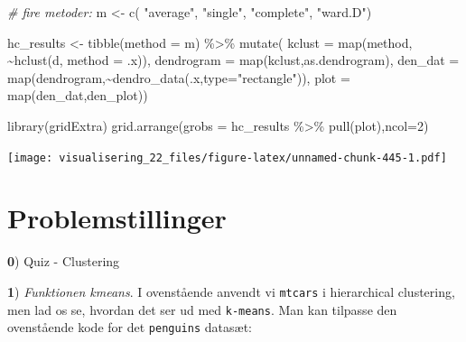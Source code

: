 \documentclass[
]{book}
\newenvironment{Shaded}{\begin{snugshade}}{\end{snugshade}}
\newcommand{\AttributeTok}[1]{\textcolor[rgb]{0.77,0.63,0.00}{#1}}
\newcommand{\CommentTok}[1]{\textcolor[rgb]{0.56,0.35,0.01}{\textit{#1}}}
\newcommand{\DecValTok}[1]{\textcolor[rgb]{0.00,0.00,0.81}{#1}}
\newcommand{\FunctionTok}[1]{\textcolor[rgb]{0.00,0.00,0.00}{#1}}
\newcommand{\NormalTok}[1]{#1}
\newcommand{\OtherTok}[1]{\textcolor[rgb]{0.56,0.35,0.01}{#1}}
\newcommand{\SpecialCharTok}[1]{\textcolor[rgb]{0.00,0.00,0.00}{#1}}
\newcommand{\StringTok}[1]{\textcolor[rgb]{0.31,0.60,0.02}{#1}}
\begin{document}
\begin{Shaded}
\begin{Highlighting}[]
\CommentTok{\# fire metoder:}
\NormalTok{m }\OtherTok{\textless{}{-}} \FunctionTok{c}\NormalTok{( }\StringTok{"average"}\NormalTok{, }\StringTok{"single"}\NormalTok{, }\StringTok{"complete"}\NormalTok{, }\StringTok{"ward.D"}\NormalTok{)}

\NormalTok{hc\_results }\OtherTok{\textless{}{-}} 
  \FunctionTok{tibble}\NormalTok{(}\AttributeTok{method =}\NormalTok{ m) }\SpecialCharTok{\%\textgreater{}\%}
  \FunctionTok{mutate}\NormalTok{( }\AttributeTok{kclust =} \FunctionTok{map}\NormalTok{(method, }\SpecialCharTok{\textasciitilde{}}\FunctionTok{hclust}\NormalTok{(d, }\AttributeTok{method =}\NormalTok{ .x)), }
          \AttributeTok{dendrogram =} \FunctionTok{map}\NormalTok{(kclust,as.dendrogram),}
          \AttributeTok{den\_dat =} \FunctionTok{map}\NormalTok{(dendrogram,}\SpecialCharTok{\textasciitilde{}}\FunctionTok{dendro\_data}\NormalTok{(.x,}\AttributeTok{type=}\StringTok{"rectangle"}\NormalTok{)),}
          \AttributeTok{plot =} \FunctionTok{map}\NormalTok{(den\_dat,den\_plot))}

\FunctionTok{library}\NormalTok{(gridExtra)}
\FunctionTok{grid.arrange}\NormalTok{(}\AttributeTok{grobs =}\NormalTok{ hc\_results }\SpecialCharTok{\%\textgreater{}\%} \FunctionTok{pull}\NormalTok{(plot),}\AttributeTok{ncol=}\DecValTok{2}\NormalTok{)}
\end{Highlighting}
\end{Shaded}

\texttt{[image: visualisering\_22\_files/figure-latex/unnamed-chunk-445-1.pdf]}

\hypertarget{problemstillinger-8}{%
\section{Problemstillinger}\label{problemstillinger-8}}

\textbf{0}) Quiz - Clustering

\textbf{1}) \emph{Funktionen kmeans}. I ovenstående anvendt vi \texttt{mtcars} i hierarchical clustering, men lad os se, hvordan det ser ud med \texttt{k-means}. Man kan tilpasse den ovenstående kode for det \texttt{penguins} datasæt:
\end{document}
